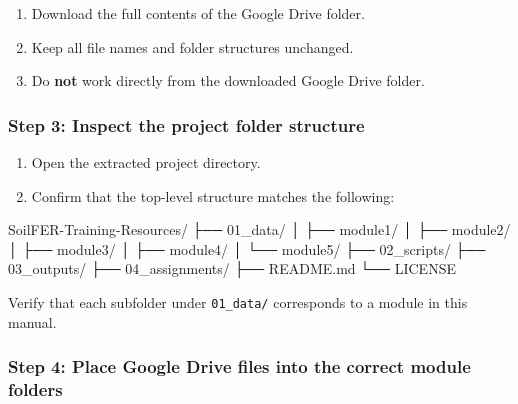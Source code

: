 \documentclass[
  10pt,
  b5paper,
  oneside]{book}
\newenvironment{Shaded}{\begin{snugshade}}{\end{snugshade}}
\newcommand{\NormalTok}[1]{#1}
\providecommand{\tightlist}{%
  \setlength{\itemsep}{0pt}\setlength{\parskip}{0pt}}
\begin{document}
\begin{enumerate}
\def\labelenumi{\arabic{enumi}.}
\tightlist
\item
  Download the full contents of the Google Drive folder.\\
\item
  Keep all file names and folder structures unchanged.\\
\item
  Do \textbf{not} work directly from the downloaded Google Drive folder.
\end{enumerate}

\subsubsection*{Step 3: Inspect the project folder structure}\label{step-3-inspect-the-project-folder-structure}

\begin{enumerate}
\def\labelenumi{\arabic{enumi}.}
\tightlist
\item
  Open the extracted project directory.\\
\item
  Confirm that the top-level structure matches the following:
\end{enumerate}

\begin{Shaded}
\begin{Highlighting}[]
\NormalTok{SoilFER{-}Training{-}Resources/}
\NormalTok{├── 01\_data/}
\NormalTok{│   ├── module1/}
\NormalTok{│   ├── module2/}
\NormalTok{│   ├── module3/}
\NormalTok{│   ├── module4/}
\NormalTok{│   └── module5/}
\NormalTok{├── 02\_scripts/}
\NormalTok{├── 03\_outputs/}
\NormalTok{├── 04\_assignments/}
\NormalTok{├── README.md}
\NormalTok{└── LICENSE}
\end{Highlighting}
\end{Shaded}

Verify that each subfolder under \texttt{01\_data/} corresponds to a module in this manual.

\subsubsection*{Step 4: Place Google Drive files into the correct module folders}\label{step-4-place-google-drive-files-into-the-correct-module-folders}
\end{document}
